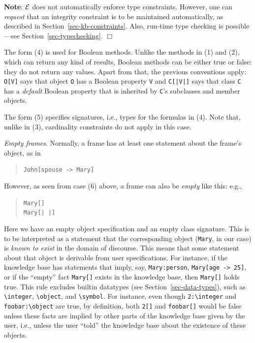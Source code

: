 \documentclass[11pt]{article}
\newcommand{\ERGO}{\mbox{\ensuremath{\cal{E}}\smaller{{\sc{RGO}}}}\xspace}
\newcommand{\FLSYSTEM}{\ERGO}
\newcommand{\mvd}{{\mbox{\tt \,->\,}}}  %
\newcommand{\bs}{\textbackslash}
\begin{document}
\begin{itemize}
  \noindent
  {\bf Note}: \FLSYSTEM does not automatically enforce type constraints.
    However, one can \emph{request} that
    an integrity constraint is to be maintained automatically, as described
    in Section~\ref{sec-kb-constraints}.
  Also, run-time type checking is possible---see Section~\ref{sec-typechecking}.
  \hfill$\Box$

  The form (4) is used for Boolean methods. Unlike the methods in (1) and (2),
  which can return any kind of results,  Boolean methods can be either true
  or false: they do not return any
  values. Apart from that, the previous conventions apply: \texttt{O[V]}
  says that object \texttt{O} has a Boolean property \texttt{V} and
  \texttt{C[|V|]} says that class \texttt{C} has a \emph{default} Boolean
  property that is inherited by \texttt{C}'s subclasses and member objects.

  The form (5) specifies signatures, i.e., types for the formulas in (4).
  Note that, unlike in (3), cardinality constraints do not apply in this
  case.

  \noindent
  \emph{Empty frames}.
  Normally, a frame has at least one statement about the frame's object,
  as in
  \begin{quote}
   \texttt{John[spouse -> Mary]}
  \end{quote}
  However, as seen from case (6) above, a frame can also be \emph{empty}
  like this:
  e.g., 
  \begin{quote}
   \texttt{Mary[]}  
   \\
   \texttt{Mary[| |]}  
  \end{quote}
  Here we have an empty object specification and an empty class signature.
  This is to be interpreted as a statement that the corresponding object
  (\texttt{Mary}, in our case) is \emph{known to exist} in the domain of
  discourse. This means that
  some statement about that object is derivable from user
  specifications. For instance, if the knowledge base has statements
  that imply, say, \texttt{Mary:person}, \texttt{Mary[age\mvd 25]}, or if
  the ``empty'' fact  \texttt{Mary[]} exists in the knowledge base, then
  \texttt{Mary[]} holds true. This rule excludes builtin datatypes (see
  Section~\ref{sec-data-types}), such as \texttt{\bs{}integer},
  \texttt{\bs{}object}, and \texttt{\bs{}symbol}. For instance, even though
  \texttt{2:\bs{}integer} and \texttt{foobar:\bs{}object} are true, by definition, both
  \texttt{2[]} and \texttt{foobar[]} would be false unless these facts are
  implied by other parts of the knowledge base given by the user, i.e.,
  unless the user ``told'' the knowledge base about the existence of these
  objects.
  

\end{itemize}
\end{document}
